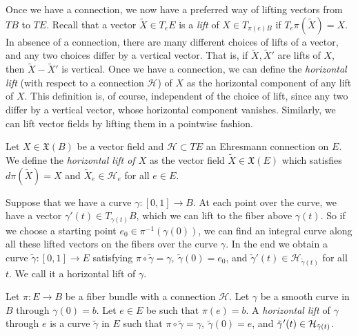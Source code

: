 \vspace{0.3cm}
\hf Once we have a connection, we now have a preferred way of lifting vectors from $TB$ to $TE$. Recall that
a vector $\tilde{X}\in T_eE$ is a \textit{lift} of $X\in T_{\pi(e)B}$ if $T_{e}\pi(\tilde{X})=X$. In absence of a connection, there are many different choices of lifts of a vector, and any two choices differ by a vertical vector. That is, if $\tilde{X},\tilde{X}'$ are lifts of $X$,  then $\tilde{X}-\tilde{X}'$ is vertical. Once we have a connection, we can define the \textit{horizontal lift} (with respect to a connection $\mathcal{H}$) of $X$ as the horizontal component of any lift of $X$. This definition
is, of course, independent of the choice of lift, since any two differ by a vertical vector, whose horizontal
component vanishes. Similarly, we can lift vector fields by lifting them in a pointwise fashion.
\begin{defn}
	Let $X\in \mathfrak{X}(B)$ be a vector field and $\mathcal{H}\subset TE$ an Ehresmann connection on $E$. We define the \textit{horizontal lift of $X$} as the vector field $\tilde{X}\in \mathfrak{X}(E)$ which satisfies $d\pi(\tilde{X})=X$ and $\tilde{X}_e\in \mathcal{H}_e$ for all $e\in E$.
\end{defn}

\hf Suppose that we have a curve $\gamma:[0,1]\to B$. At each point over the curve, we have a vector $\gamma'(t)\in T_{\gamma(t)}B$, which we can lift to the fiber above $\gamma(t)$. So if we choose a starting point $e_0\in \pi^{-1}(\gamma(0))$, we can find an integral curve along all these lifted vectors on the fibers over the curve $\gamma$. In the end we obtain a curve $\tilde{\gamma}:[0,1]\to E$ satisfying $\pi\circ \tilde{\gamma}=\gamma,~\tilde{\gamma}(0)=e_0$, and $\tilde{\gamma}'(t)\in \mathcal{H}_{\tilde{\gamma}(t)}$ for all $t$. We call it a horizontal lift of $\gamma$.

\begin{defn}\label{defn:horizontal-lift}
	Let $\pi:E\to B$ be a fiber bundle with a connection $\mathcal{H}$. Let $\gamma$ be a smooth curve in $B$ through $\gamma(0)=b$. Let $e\in E$ be such that $\pi(e)=b$. A \textit{horizontal lift} of $\gamma$ through $e$ is a curve $\tilde{\gamma}$ in $E$ such that $\pi\circ \tilde{\gamma}=\gamma,~\tilde{\gamma}(0)=e$, and $\tilde{\gamma}\kern 0.02cm'(t)\in \mathcal{H}_{\tilde{\gamma}(t)}$.
\end{defn}

